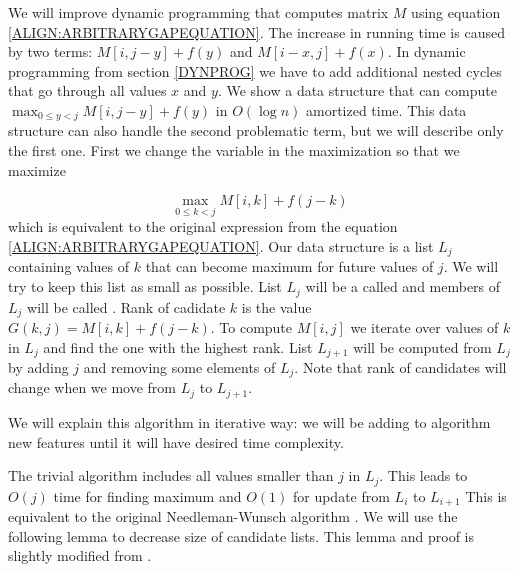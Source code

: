 We will improve dynamic programming that computes matrix $M$ using equation
\ref{ALIGN:ARBITRARYGAPEQUATION}. The increase in running time is caused by two
terms: $M[i,j-y]+f(y)$ and
$M[i-x,j]+f(x)$. In dynamic programming from section \ref{DYNPROG} we  have
to add additional nested cycles that go through all values $x$ and $y$. We show
a data
structure that can compute $\max_{0\leq y < j}M[i,j-y]+f(y)$ in $O(\log n)$
amortized time.
This data structure can also handle the second problematic term, but we
will describe only the first one. First we change the variable in the
maximization so that we maximize

\begin{equation}
\max_{0\leq k < j}M[i,k]+f(j-k)\label{CONVEX:MAXFUNCTION}
\end{equation}
which is equivalent to the original expression from the equation
\ref{ALIGN:ARBITRARYGAPEQUATION}.  Our data structure is a list $L_j$ containing
values of 
$k$ that can become maximum for future values of $j$. We will try to keep this list as small as
possible. List $L_j$ will be a called  and members of $L_j$
will be called . Rank of cadidate $k$ is the value
$G(k,j)=M[i,k]+f(j-k)$. To compute $M[i,j]$ we iterate over values of $k$ in
$L_j$ and find the one with the highest rank.
List $L_{j+1}$ will be computed from $L_j$ by adding $j$ and
removing some elements of $L_j$. 
Note that rank of
candidates will change when we move from $L_j$ to $L_{j+1}$.

We will explain this algorithm in iterative way: we will be adding to algorithm
new features until it will have desired time complexity. 

The trivial algorithm includes all values smaller than $j$ in $L_j$.
This leads to $O(j)$ time for finding maximum and $O(1)$ for update
from $L_i$ to $L_{i+1}$
This is equivalent to the original Needleman-Wunsch algorithm
\cite{Needleman1970}. 
We will use the following lemma to
decrease size of candidate lists. This lemma and proof is  slightly modified
from 
\cite{GusfieldBook}.


